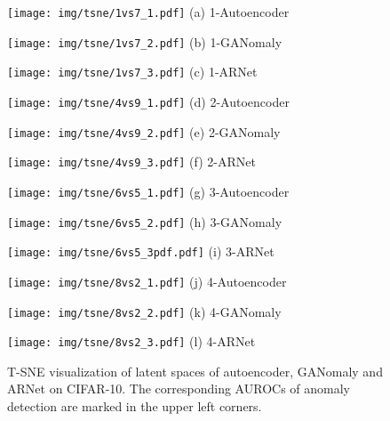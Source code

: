 \documentclass[journal]{IEEEtran}
\begin{document}
\begin{figure*}[tbph]
  \begin{minipage}[t]{0.158\textwidth}
\centering
\texttt{[image: img/tsne/1vs7\_1.pdf]}
\footnotesize
(a) 1-Autoencoder
\end{minipage}
\begin{minipage}[t]{0.158\textwidth}
\centering
\texttt{[image: img/tsne/1vs7\_2.pdf]}
\footnotesize
(b) 1-GANomaly
\end{minipage}
\begin{minipage}[t]{0.158\textwidth}
\centering
\texttt{[image: img/tsne/1vs7\_3.pdf]}
\footnotesize
(c) 1-ARNet
\end{minipage}
\begin{minipage}[t]{0.158\textwidth}
\centering
\texttt{[image: img/tsne/4vs9\_1.pdf]}
\footnotesize
(d) 2-Autoencoder
\end{minipage}
\begin{minipage}[t]{0.158\textwidth}
\centering
\texttt{[image: img/tsne/4vs9\_2.pdf]}
\footnotesize
(e) 2-GANomaly
\end{minipage}
\begin{minipage}[t]{0.158\textwidth}
\centering
\texttt{[image: img/tsne/4vs9\_3.pdf]}
\footnotesize
(f) 2-ARNet
\end{minipage}

\begin{minipage}[t]{0.158\textwidth}
\centering
\texttt{[image: img/tsne/6vs5\_1.pdf]}
\footnotesize
(g) 3-Autoencoder
\end{minipage}
\begin{minipage}[t]{0.158\textwidth}
\centering
\texttt{[image: img/tsne/6vs5\_2.pdf]}
\footnotesize
(h) 3-GANomaly
\end{minipage}
\begin{minipage}[t]{0.158\textwidth}
\centering
\texttt{[image: img/tsne/6vs5\_3pdf.pdf]}
\footnotesize
(i) 3-ARNet
\end{minipage}
\begin{minipage}[t]{0.158\textwidth}
\centering
\texttt{[image: img/tsne/8vs2\_1.pdf]}
\footnotesize
(j) 4-Autoencoder
\end{minipage}
\begin{minipage}[t]{0.158\textwidth}
\centering
\texttt{[image: img/tsne/8vs2\_2.pdf]}
\footnotesize
(k) 4-GANomaly
\end{minipage}
\begin{minipage}[t]{0.158\textwidth}
\centering
\texttt{[image: img/tsne/8vs2\_3.pdf]}
\footnotesize
(l) 4-ARNet
\end{minipage}
\caption{T-SNE visualization of latent spaces of autoencoder, GANomaly and ARNet on CIFAR-10. The corresponding AUROCs of anomaly detection are marked in the upper left corners.}
  \label{fig:tsne_cifar}
\end{figure*}
\end{document}
